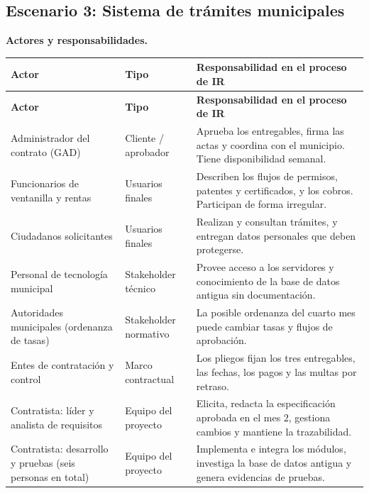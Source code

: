 \documentclass[12pt,a4paper]{article}
\begin{document}
\subsection{Escenario 3: Sistema de trámites municipales}

\textbf{Actores y responsabilidades.}

{\small
\setlength{\tabcolsep}{4pt}
\renewcommand{\arraystretch}{1.3}
\begin{longtable}{
|>{\raggedright\arraybackslash}p{}
|>{\raggedright\arraybackslash}p{}
|>{\raggedright\arraybackslash}p{}|}
\hline
\textbf{Actor} & \textbf{Tipo} & \textbf{Responsabilidad en el proceso de IR} \\
\hline
\endfirsthead
\hline
\textbf{Actor} & \textbf{Tipo} & \textbf{Responsabilidad en el proceso de IR} \\
\hline
\endhead
Administrador del contrato (GAD) & Cliente / aprobador & Aprueba los entregables, firma las actas y coordina con el municipio. Tiene disponibilidad semanal. \\
\hline
Funcionarios de ventanilla y rentas & Usuarios finales & Describen los flujos de permisos, patentes y certificados, y los cobros. Participan de forma irregular. \\
\hline
Ciudadanos solicitantes & Usuarios finales & Realizan y consultan trámites, y entregan datos personales que deben protegerse. \\
\hline
Personal de tecnología municipal & Stakeholder técnico & Provee acceso a los servidores y conocimiento de la base de datos antigua sin documentación. \\
\hline
Autoridades municipales (ordenanza de tasas) & Stakeholder normativo & La posible ordenanza del cuarto mes puede cambiar tasas y flujos de aprobación. \\
\hline
Entes de contratación y control & Marco contractual & Los pliegos fijan los tres entregables, las fechas, los pagos y las multas por retraso. \\
\hline
Contratista: líder y analista de requisitos & Equipo del proyecto & Elicita, redacta la especificación aprobada en el mes 2, gestiona cambios y mantiene la trazabilidad. \\
\hline
Contratista: desarrollo y pruebas (seis personas en total) & Equipo del proyecto & Implementa e integra los módulos, investiga la base de datos antigua y genera evidencias de pruebas. \\
\hline
\end{longtable}
}
\end{document}
